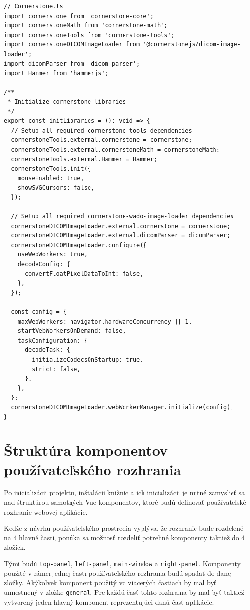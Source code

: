 \begin{minipage}[]{\linewidth}
\begin{verbatim}
// Cornerstone.ts
import cornerstone from 'cornerstone-core';
import cornerstoneMath from 'cornerstone-math';
import cornerstoneTools from 'cornerstone-tools';
import cornerstoneDICOMImageLoader from '@cornerstonejs/dicom-image-loader';
import dicomParser from 'dicom-parser';
import Hammer from 'hammerjs';

/**
 * Initialize cornerstone libraries
 */
export const initLibraries = (): void => {
  // Setup all required cornerstone-tools dependencies
  cornerstoneTools.external.cornerstone = cornerstone;
  cornerstoneTools.external.cornerstoneMath = cornerstoneMath;
  cornerstoneTools.external.Hammer = Hammer;
  cornerstoneTools.init({
    mouseEnabled: true,
    showSVGCursors: false,
  });

  // Setup all required cornerstone-wado-image-loader dependencies
  cornerstoneDICOMImageLoader.external.cornerstone = cornerstone;
  cornerstoneDICOMImageLoader.external.dicomParser = dicomParser;
  cornerstoneDICOMImageLoader.configure({
    useWebWorkers: true,
    decodeConfig: {
      convertFloatPixelDataToInt: false,
    },
  });

  const config = {
    maxWebWorkers: navigator.hardwareConcurrency || 1,
    startWebWorkersOnDemand: false,
    taskConfiguration: {
      decodeTask: {
        initializeCodecsOnStartup: true,
        strict: false,
      },
    },
  };
  cornerstoneDICOMImageLoader.webWorkerManager.initialize(config);
}
\end{verbatim}
\end{minipage}

\section {Štruktúra komponentov používateľského rozhrania}
Po inicializácii projektu, inštalácii knižníc a ich inicializácii je nutné zamyslieť sa nad štruktúrou samotných Vue komponentov, ktoré budú definovať používateľské rozhranie webovej aplikácie.

Keďže z návrhu používateľského prostredia vyplýva, že rozhranie bude rozdelené na 4 hlavné časti, ponúka sa možnosť rozdeliť potrebné komponenty taktiež do 4 zložiek.

Tými budú \texttt{top-panel}, \texttt{left-panel}, \texttt{main-window} a \texttt{right-panel}. Komponenty použité v rámci jednej časti používateľského rozhrania budú spadať do danej zložky. Akýkoľvek komponent použitý vo viacerých častiach by mal byť umiestnený v zložke \texttt{general}.
Pre každú časť tohto rozhrania by mal byť taktiež vytvorený jeden hlavný komponent reprezentujúci danú časť aplikácie.

